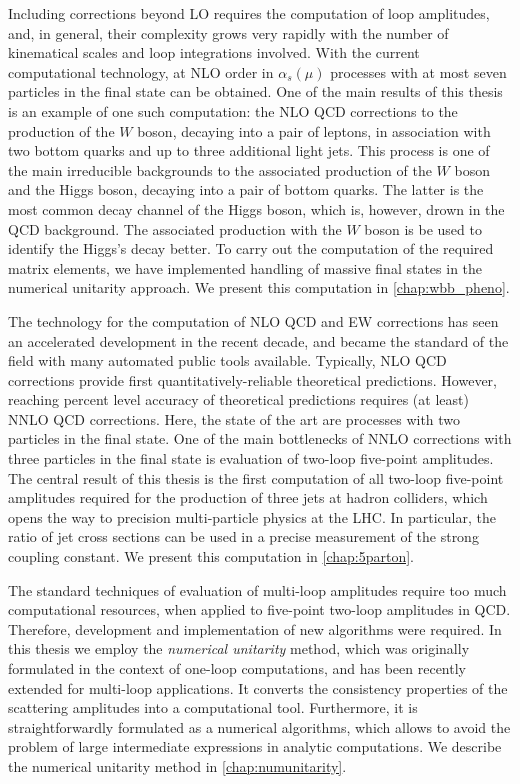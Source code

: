Including corrections beyond LO requires the computation of loop amplitudes, and, in general,
their complexity grows very rapidly with the number of kinematical scales and loop integrations involved.
With the current computational technology, at NLO order in $\alpha_s(\mu)$ processes with at most seven particles in the final state
can be obtained. One of the main results of this thesis is an example of one such computation:
the NLO QCD corrections to the production of the $W$ boson, decaying into a pair of leptons, in association with 
two bottom quarks and up to three additional light jets. 
This process is one of the main irreducible backgrounds to the associated 
production of the $W$ boson and the Higgs boson, decaying into a pair of bottom quarks.
The latter is the most common decay channel of the Higgs boson, which is, however, drown in the QCD background.
The associated production with the $W$ boson is be used to identify the Higgs's decay better.
To carry out the computation of the required matrix elements, we have implemented handling of massive final states in the numerical unitarity approach.
We present this computation in \cref{chap:wbb_pheno}.

The technology for the computation of NLO QCD and EW corrections has seen an accelerated development
in the recent decade, and became the standard of the field with many automated public tools available.
Typically, NLO QCD corrections provide first quantitatively-reliable theoretical predictions.
However, reaching percent level accuracy of theoretical predictions requires (at least) NNLO QCD corrections.
Here, the state of the art are processes with two particles in the final state.
One of the main bottlenecks of NNLO corrections with three particles in the final state is evaluation of two-loop five-point amplitudes.
The central result of this thesis is the first computation of all two-loop five-point amplitudes required for the production
of three jets at hadron colliders, which opens the way to precision multi-particle physics at the LHC.
In particular, the ratio of jet cross sections can be used in a precise measurement of the strong coupling constant.
We present this computation in  \cref{chap:5parton}.

The standard techniques of evaluation of multi-loop amplitudes require too much computational resources,
when applied to five-point two-loop amplitudes in QCD.
Therefore, development and implementation of new algorithms were required.
In this thesis we employ the \emph{numerical unitarity} method, which
was originally formulated in the context of one-loop computations,
and has been recently extended for multi-loop applications.
It converts the consistency properties of the scattering amplitudes into a computational tool.
Furthermore, it is straightforwardly formulated as a numerical algorithms, which allows to avoid
the problem of large intermediate expressions in analytic computations.
We describe the numerical unitarity method in \cref{chap:numunitarity}.

